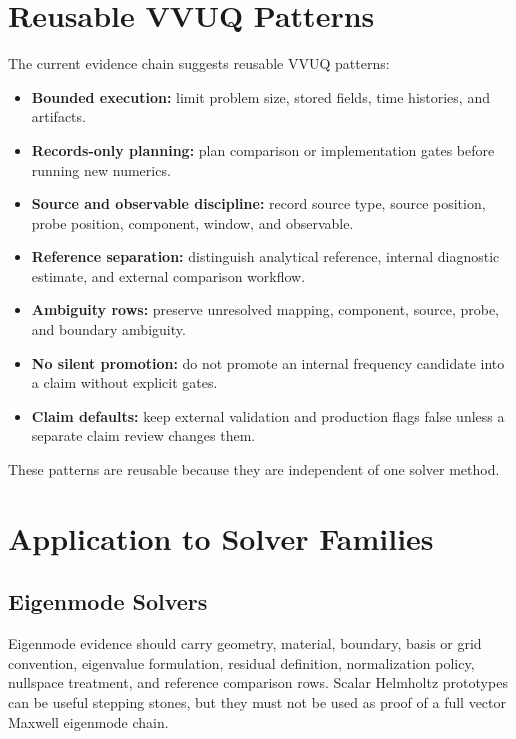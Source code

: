 \documentclass[11pt,a4paper]{article}
\begin{document}
\section{Reusable VVUQ Patterns}
\label{sec:reusable-vvuq-patterns}

The current evidence chain suggests reusable VVUQ patterns:

\begin{itemize}
  \item \textbf{Bounded execution:} limit problem size, stored fields, time histories, and artifacts.
  \item \textbf{Records-only planning:} plan comparison or implementation gates before running new numerics.
  \item \textbf{Source and observable discipline:} record source type, source position, probe position, component, window, and observable.
  \item \textbf{Reference separation:} distinguish analytical reference, internal diagnostic estimate, and external comparison workflow.
  \item \textbf{Ambiguity rows:} preserve unresolved mapping, component, source, probe, and boundary ambiguity.
  \item \textbf{No silent promotion:} do not promote an internal frequency candidate into a claim without explicit gates.
  \item \textbf{Claim defaults:} keep external validation and production flags false unless a separate claim review changes them.
\end{itemize}

These patterns are reusable because they are independent of one solver method.

\section{Application to Solver Families}
\label{sec:application-to-solver-families}

\subsection{Eigenmode Solvers}

Eigenmode evidence should carry geometry, material, boundary, basis or grid convention, eigenvalue formulation, residual definition, normalization policy, nullspace treatment, and reference comparison rows. Scalar Helmholtz prototypes can be useful stepping stones, but they must not be used as proof of a full vector Maxwell eigenmode chain.
\end{document}
